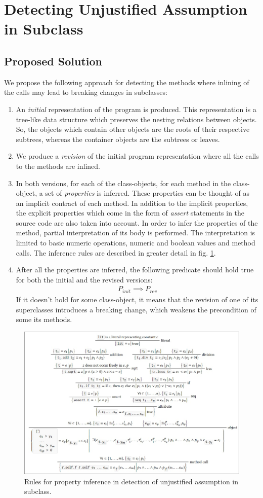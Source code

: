 \section{Detecting Unjustified Assumption in Subclass}
\label{impl:unjustified}

\subsection{Proposed Solution}
We propose the following approach for detecting the methods where inlining of the calls may lead to breaking changes in subclasses:
\begin{enumerate}
    \item An \textit{initial} representation of the program is produced. This representation is a tree-like data structure which preserves the nesting relations between objects. So, the objects which contain other objects are the roots of their respective subtrees, whereas the container objects are the subtrees or leaves.
    \item We produce a \textit{revision} of the initial program representation where all the calls to the methods are inlined.
    \item In both versions, for each of the class-objects, for each method in the class-object, a set of \textit{properties} is inferred.  These properties can be thought of as an implicit contract \cite{meyer} of each method. In addition to the implicit properties, the explicit properties which come in the form of \textit{assert} statements in the source code are also taken into account. In order to infer the properties of the method, partial interpretation of its body is performed. The interpretation is limited to basic numeric operations, numeric and boolean values and method calls. The inference rules are described in greater detail in fig. \ref{fig:props}.
    \item After all the properties are inferred, the following predicate should hold true for both the initial and the revised versions:
          \begin{align*}
              P_{init} \implies P_{rev}
          \end{align*}
          If it doesn't hold for some class-object, it means that the revision of one of its superclasses introduces a breaking change, which weakens the precondition of some its methods.
\end{enumerate}

\begin{figure}
    \includegraphics[width=\textwidth]{figs/properties}
    \caption{Rules for property inference in detection of unjustified assumption in subclass.}
    \label{fig:props}
\end{figure}

